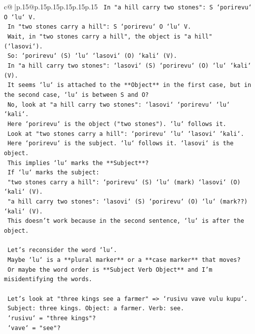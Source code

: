 \documentclass{article}
\begin{document}
{\begin{supertabular}{c@{$\;$}|p{.15\linewidth}@{}p{.15\linewidth}p{.15\linewidth}p{.15\linewidth}p{.15\linewidth}p{.15\linewidth}}
{{{\texttt{   In "a hill carry two stones": S `porirevu` O `lu` V.} \\
\texttt{   In "two stones carry a hill": S `porirevu` O `lu` V.} \\
\texttt{   Wait, in "two stones carry a hill", the object is "a hill" (`lasovi`).} \\
\texttt{   So: `porirevu` (S) `lu` `lasovi` (O) `kali` (V).} \\
\texttt{   In "a hill carry two stones": `lasovi` (S) `porirevu` (O) `lu` `kali` (V).} \\
\texttt{   It seems `lu` is attached to the **Object** in the first case, but in the second case, `lu` is between S and O?} \\
\texttt{   No, look at "a hill carry two stones": `lasovi` `porirevu` `lu` `kali`.} \\
\texttt{   Here `porirevu` is the object ("two stones"). `lu` follows it.} \\
\texttt{   Look at "two stones carry a hill": `porirevu` `lu` `lasovi` `kali`.} \\
\texttt{   Here `porirevu` is the subject. `lu` follows it. `lasovi` is the object.} \\
\texttt{   This implies `lu` marks the **Subject**?} \\
\texttt{   If `lu` marks the subject:} \\
\texttt{   "two stones carry a hill": `porirevu` (S) `lu` (mark) `lasovi` (O) `kali` (V).} \\
\texttt{   "a hill carry two stones": `lasovi` (S) `porirevu` (O) `lu` (mark??) `kali` (V).} \\
\texttt{   This doesn't work because in the second sentence, `lu` is after the object.} \\
\\ 
\texttt{   Let's reconsider the word `lu`.} \\
\texttt{   Maybe `lu` is a **plural marker** or a **case marker** that moves?} \\
\texttt{   Or maybe the word order is **Subject Verb Object** and I'm misidentifying the words.} \\
\\ 
\texttt{   Let's look at "three kings see a farmer" => `rusivu vave vulu kupu`.} \\
\texttt{   Subject: three kings. Object: a farmer. Verb: see.} \\
\texttt{   `rusivu` = "three kings"?} \\
\texttt{   `vave` = "see"?} \\
}}}
\end{supertabular}}
\end{document}
